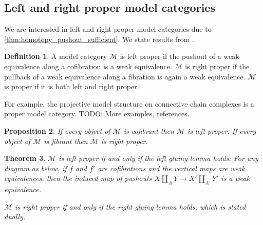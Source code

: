 \documentclass{scrartcl}
\let\emph\relax
\theoremstyle{plain}
\newtheorem{theorem}{Theorem}[section]
\newtheorem{proposition}[theorem]{Proposition}
\theoremstyle{definition}
\newtheorem{definition}[theorem]{Definition}
\newcommand{\cat}[1]{\mathcal{#1}}
\newcommand{\nto}{\Rightarrow}
\renewcommand{\coprod}{\mathbin{\amalg}}
\DeclareMathOperator{\Ho}{Ho}
\newcommand{\comp}{\mathbin{\circ}}
\begin{document}
\subsection{Left and right proper model categories}
We are interested in left and right proper model categories due to \ref{thm:homotopy_pushout_sufficient}. We state results from \cite[15.4]{may2011more}.

\begin{definition}
    A model category $\cat M$ is left proper if the pushout of a weak equivalence along a cofibration is a weak equivalence. $\cat M$ is right proper if the pullback of a weak equivalence along a fibration is again a weak equivalence. $\cat M$ is proper if it is both left and right proper.
\end{definition}

For example, the projective model structure on connective chain complexes is a proper model category. TODO: More examples, references.

\begin{proposition}
    If every object of $\cat M$ is cofibrant then $\cat M$ is left proper. If every object of $\cat M$ is fibrant then $\cat M$ is right proper.
\end{proposition}

\begin{theorem}
    $\cat M$ is left proper if and only if the left gluing lemma holds: For any diagram as below, if $f$ and $f'$ are cofibrations and the vertical maps are weak equivalences, then the induced map of pushouts $X\coprod_A Y\to X'\coprod_{A'} Y'$ is a weak equivalence.

    \begin{center}
    \end{center}


    $\cat M$ is right proper if and only if the right gluing lemma holds, which is stated dually.
\end{theorem}

    
\end{document}

